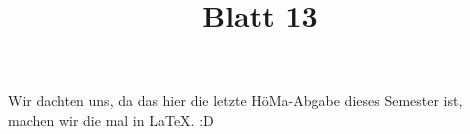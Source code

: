 

\subject{V353}
\title{Blatt 13}



\maketitle
\thispagestyle{empty}
\tableofcontents
\newpage

Wir dachten uns, da das hier die letzte HöMa-Abgabe dieses Semester ist, machen wir die mal in \LaTeX. :D




\printbibliography{}


